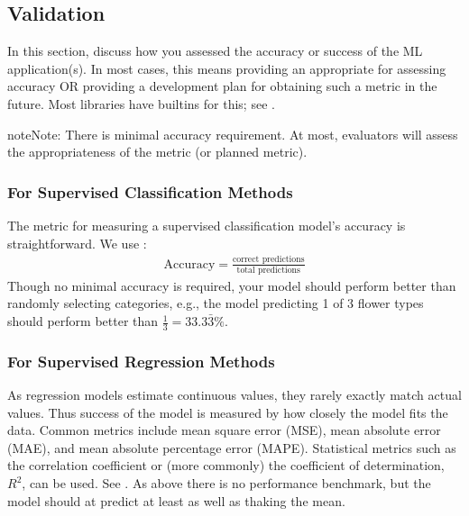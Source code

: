 \documentclass[letterpaper,10pt,english]{jupyterBook}
\begin{document}
\subsection{Validation}
\label{\detokenize{task2_doc/task2_doc_d:validation}}\label{\detokenize{task2_doc/task2_doc_d:task2-doc-d-validation}}
\sphinxAtStartPar
In this section, discuss how you assessed the accuracy or success of the ML application(s). In most cases, this means providing an appropriate  for assessing accuracy OR providing a development plan for obtaining such a metric in the future. Most libraries have builtins for this; see .

\begin{sphinxadmonition}{note}{Note:}
\sphinxAtStartPar
There is  minimal accuracy requirement. At most, evaluators will assess the appropriateness of the metric (or planned metric).
\end{sphinxadmonition}


\subsubsection{For Supervised Classification Methods}
\label{\detokenize{task2_doc/task2_doc_d:for-supervised-classification-methods}}\label{\detokenize{task2_doc/task2_doc_d:task2d-accuracy-super}}
\sphinxAtStartPar
The metric for measuring a supervised classification model’s accuracy is straightforward. We use :
\begin{equation*}
\begin{split}\text{Accuracy}=\frac{\text{correct predictions}}{\text{total predictions}}\end{split}
\end{equation*}
\sphinxAtStartPar
Though no minimal accuracy is required, your model should perform better than randomly selecting categories, e.g., the model predicting 1 of 3 flower types should perform better than \(\frac{1}{3} = 33.3\bar{3}\%\).


\subsubsection{For Supervised Regression Methods}
\label{\detokenize{task2_doc/task2_doc_d:for-supervised-regression-methods}}
\sphinxAtStartPar
As regression models estimate continuous values, they rarely exactly match actual values. Thus success of the model is measured by how closely the model fits the data. Common metrics include mean square error (MSE), mean absolute error (MAE), and mean absolute percentage error (MAPE). Statistical metrics such as the correlation coefficient or (more commonly) the coefficient of determination, \(R^{2}\), can be used. See . As above there is no performance benchmark, but the model should at predict at least as well as thaking the mean.
\end{document}
